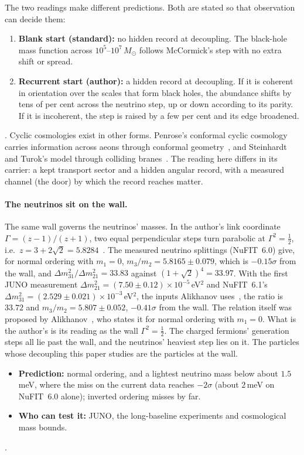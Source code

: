 The two readings make different predictions. Both are stated so that observation can decide them:
\begin{enumerate}
\item \textbf{Blank start (standard):} no hidden record at decoupling. The black-hole mass function across $10^5$--$10^7\,M_\odot$ follows McCormick's step with no extra shift or spread.
\item \textbf{Recurrent start (author):} a hidden record at decoupling. If it is coherent in orientation over the scales that form black holes, the abundance shifts by tens of per cent across the neutrino step, up or down according to its parity. If it is incoherent, the step is raised by a few per cent and its edge broadened.
\end{enumerate}
. Cyclic cosmologies exist in other forms. Penrose's conformal cyclic cosmology carries information across aeons through conformal geometry~\cite{CCC}, and Steinhardt and Turok's model through colliding branes~\cite{ST}. The reading here differs in its carrier: a kept transport sector and a hidden angular record, with a measured channel (the door) by which the record reaches matter.

\paragraph{The neutrinos sit on the wall.} The same wall governs the neutrinos' masses. In the author's link coordinate $\Gamma=(z-1)/(z+1)$, two equal perpendicular steps turn parabolic at $\Gamma^2=\tfrac12$, i.e.\ $z=3+2\sqrt2=5.8284$~\cite{SMball}. The measured neutrino splittings (NuFIT~6.0) give, for normal ordering with $m_1=0$, $m_3/m_2=5.8165\pm0.079$, which is $-0.15\sigma$ from the wall, and $\Delta m^2_{31}/\Delta m^2_{21}=33.83$ against $(1+\sqrt2)^4=33.97$. With the first JUNO measurement $\Delta m^2_{21}=(7.50\pm0.12)\times10^{-5}\,$eV$^2$ and NuFIT~6.1's $\Delta m^2_{31}=(2.529\pm0.021)\times10^{-3}\,$eV$^2$, the inputs Alikhanov uses~\cite{Alik}, the ratio is $33.72$ and $m_3/m_2=5.807\pm0.052$, $-0.41\sigma$ from the wall. The relation itself was proposed by Alikhanov~\cite{Alik}, who states it for normal ordering with $m_1=0$. What is the author's is its reading as the wall $\Gamma^2=\tfrac12$. The charged fermions' generation steps all lie past the wall, and the neutrinos' heaviest step lies on it. The particles whose decoupling this paper studies are the particles at the wall.
\begin{itemize}
\item \textbf{Prediction:} normal ordering, and a lightest neutrino mass below about $1.5$\,meV, where the miss on the current data reaches $-2\sigma$ (about $2$\,meV on NuFIT~6.0 alone); inverted ordering misses by far.
\item \textbf{Who can test it:} JUNO, the long-baseline experiments and cosmological mass bounds.
\end{itemize}
.

